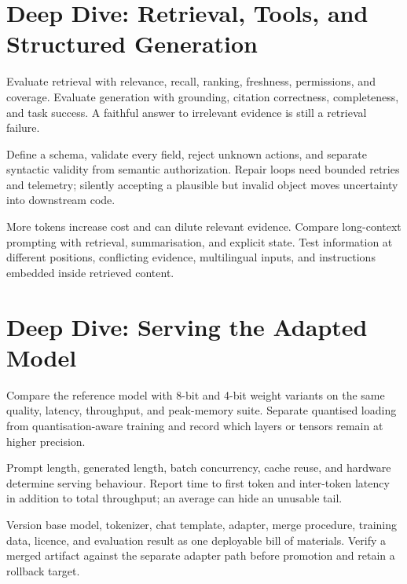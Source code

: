 \expandafter\def\csname almanachdeepdive@nlp-generative-ai\endcsname{%
\section{Deep Dive: Retrieval, Tools, and Structured Generation}
\begin{tcbitemize}[skin=sectionraster]
\tcbitem[title={RAG Has Two Evaluations},raster multicolumn=3]
Evaluate retrieval with relevance, recall, ranking, freshness, permissions, and
coverage.
Evaluate generation with grounding, citation correctness, completeness, and
task success.
A faithful answer to irrelevant evidence is still a retrieval failure.

\tcbitem[title={Structured Output Is a Contract},raster multicolumn=3]
Define a schema, validate every field, reject unknown actions, and separate
syntactic validity from semantic authorization.
Repair loops need bounded retries and telemetry; silently accepting a plausible
but invalid object moves uncertainty into downstream code.

\tcbitem[title={Long Context Is Not Perfect Memory},raster multicolumn=6]
More tokens increase cost and can dilute relevant evidence.
Compare long-context prompting with retrieval, summarisation, and explicit
state.
Test information at different positions, conflicting evidence, multilingual
inputs, and instructions embedded inside retrieved content.
\end{tcbitemize}
}

\expandafter\def\csname almanachdeepdive@practical-llm-engineering\endcsname{%
\section{Deep Dive: Serving the Adapted Model}
\begin{tcbitemize}[skin=sectionraster]
\tcbitem[title={Quantisation Experiment},raster multicolumn=3]
Compare the reference model with 8-bit and 4-bit weight variants on the same
quality, latency, throughput, and peak-memory suite.
Separate quantised loading from quantisation-aware training and record which
layers or tensors remain at higher precision.

\tcbitem[title={Measure the Workload Shape},raster multicolumn=3]
Prompt length, generated length, batch concurrency, cache reuse, and hardware
determine serving behaviour.
Report time to first token and inter-token latency in addition to total
throughput; an average can hide an unusable tail.

\tcbitem[title={Adapter Governance},raster multicolumn=6]
Version base model, tokenizer, chat template, adapter, merge procedure,
training data, licence, and evaluation result as one deployable bill of
materials.
Verify a merged artifact against the separate adapter path before promotion and
retain a rollback target.
\end{tcbitemize}
}

